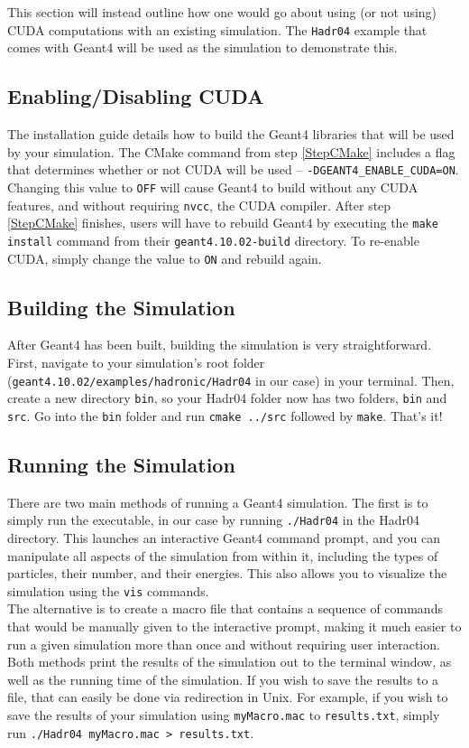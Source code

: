 \documentclass[12pt]{article}
\begin{document}
This section will instead outline how one would go about using (or not using) CUDA computations with an existing simulation. The \texttt{Hadr04} example that comes with Geant4 will be used as the simulation to demonstrate this.

\subsection{Enabling/Disabling CUDA} %
The installation guide details how to build the Geant4 libraries that will be used by your simulation. The CMake command from step \ref{StepCMake} includes a flag that determines whether or not CUDA will be used -- \texttt{-DGEANT4\_ENABLE\_CUDA=ON}. Changing this value to \texttt{OFF} will cause Geant4 to build without any CUDA features, and without requiring \texttt{nvcc}, the CUDA compiler. After step \ref{StepCMake} finishes, users will have to rebuild Geant4 by executing the \texttt{make install} command from their \texttt{geant4.10.02-build} directory. To re-enable CUDA, simply change the value to \texttt{ON} and rebuild again.

\subsection{Building the Simulation}\label{SecSimulations} %
After Geant4 has been built, building the simulation is very straightforward. First, navigate to your simulation's root folder (\texttt{geant4.10.02/examples/hadronic/Hadr04} in our case) in your terminal. Then, create a new directory \texttt{bin}, so your Hadr04 folder now has two folders, \texttt{bin} and \texttt{src}. Go into the \texttt{bin} folder and run \texttt{cmake ../src} followed by \texttt{make}. That's it!

\subsection{Running the Simulation}\label{SecRedirect} %
There are two main methods of running a Geant4 simulation. The first is to simply run the executable, in our case by running \texttt{./Hadr04} in the Hadr04 directory. This launches an interactive Geant4 command prompt, and you can manipulate all aspects of the simulation from within it, including the types of particles, their number, and their energies. This also allows you to visualize the simulation using the \texttt{vis} commands.\\

The alternative is to create a macro file that contains a sequence of commands that would be manually given to the interactive prompt, making it much easier to run a given simulation more than once and without requiring user interaction. Both methods print the results of the simulation out to the terminal window, as well as the running time of the simulation. If you wish to save the results to a file, that can easily be done via redirection in Unix. For example, if you wish to save the results of your simulation using \texttt{myMacro.mac} to \texttt{results.txt}, simply run \texttt{./Hadr04 myMacro.mac > results.txt}.
\end{document}
